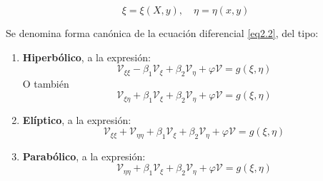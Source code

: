 \documentclass[../main]{subfiles}
\begin{document}
    \begin{equation}
        \xi=\xi(X,y), \quad \eta=\eta(x,y)
    \end{equation}
\begin{definicion}
    Se denomina forma canónica de la ecuación diferencial \eqref{eq2.2}, del tipo:
    \begin{enumerate}
        \item \textbf{Hiperbólico}, a la expresión:
        \begin{equation}
            \mathcal{V}_{\xi \xi}-\beta_1 \mathcal{V}_{\xi}+\beta_2 \mathcal{V}_{\eta}+\varphi \mathcal{V}=g(\xi, \eta)
        \end{equation}
        O también
        \begin{equation}
            \mathcal{V}_{\xi \eta}+\beta_1 \mathcal{V}_{\xi}+\beta_2 \mathcal{V}_{\eta}+\varphi \mathcal{V}=g(\xi,\eta)
        \end{equation}
        \item \textbf{Elíptico}, a la expresión:
        \begin{equation}
            \mathcal{V}_{\xi \xi}+\mathcal{V}_{\eta \eta}+\beta_1 \mathcal{V}_{\xi}+\beta_2 \mathcal{V}_{\eta}+\varphi \mathcal{V}=g(\xi,\eta)
        \end{equation}
        \item \textbf{Parabólico}, a la expresión:
        \begin{equation}
            \mathcal{V}_{\eta \eta}+\beta_1 \mathcal{V}_{\xi}+\beta_2 \mathcal{V}_{\eta}+\varphi \mathcal{V}=g(\xi, \eta)
        \end{equation}
    \end{enumerate}
\end{definicion}
\end{document}
